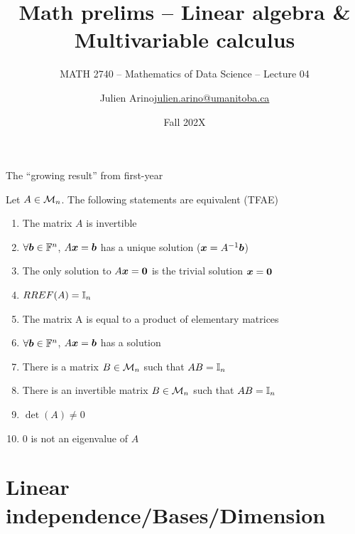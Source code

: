 \documentclass[aspectratio=169]{beamer}\usepackage[]{graphicx}\usepackage[]{xcolor}
\subtitle{MATH 2740 -- Mathematics of Data Science -- Lecture 04}
\author{\texorpdfstring{Julien Arino\newline\url{julien.arino@umanitoba.ca}}{Julien Arino}}
\institute{Department of Mathematics @ University of Manitoba}
\date{Fall 202X}
\title{Math prelims -- Linear algebra \& Multivariable calculus}
\begin{document}



\begin{frame}{The ``growing result'' from first-year}
	\begin{importanttheorem}
		Let $A\in\mathcal{M}_n$. The following statements are equivalent (TFAE)
		\begin{enumerate}
			\item The matrix $A$ is invertible
			\item $\forall\bm{b}\in\mathbb{F}^n$, $A\bm{x} = \bm{b}$ has a unique solution ($\bm{x}=A^{-1}\bm{b}$)
			\item The only solution to $A\bx = \b0$ is the trivial solution $\bx = \b0$
			\item $RREF(A)=\mathbb{I}_n$
			\item The matrix A is equal to a product of elementary matrices
			\item $\forall\bm{b}\in\mathbb{F}^n$, $A\bm{x} = \bm{b}$ has a solution
			\item There is a matrix $B\in\mathcal{M}_n$ such that $AB = \mathbb{I}_n$
			\item There is an invertible matrix $B\in\mathcal{M}_n$ such that $AB = \mathbb{I}_n$
			\item $\det(A)\neq 0$
			\item $0$ is not an eigenvalue of $A$
		\end{enumerate}
	\end{importanttheorem}
\end{frame}



\section{Linear independence/Bases/Dimension}
\end{document}
